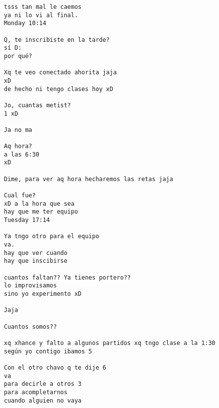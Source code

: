 \begin{verbatim}
tsss tan mal le caemos 
ya ni lo vi al final.
Monday 10:14

Q, te inscribiste en la tarde?
sí D:
por qué?

Xq te veo conectado ahorita jaja
xD
de hecho ni tengo clases hoy xD

Jo, cuantas metist?
1 xD

Ja no ma

Aq hora?
a las 6:30
xD

Dime, para ver aq hora hecharemos las retas jaja

Cual fue?
xD a la hora que sea
hay que me ter equipo
Tuesday 17:14

Ya tngo otro para el equipo
va.
hay que ver cuando
hay que inscibirse

cuantos faltan?? Ya tienes portero??
lo improvisamos
sino yo experimento xD

Jaja

Cuantos somos??

xq xhance y falto a algunos partidos xq tngo clase a la 1:30
según yo contigo ibamos 5

Con el otro chavo q te dije 6
va
para decirle a otros 3
para acompletarnos
cuando alguien no vaya
\end{verbatim}


